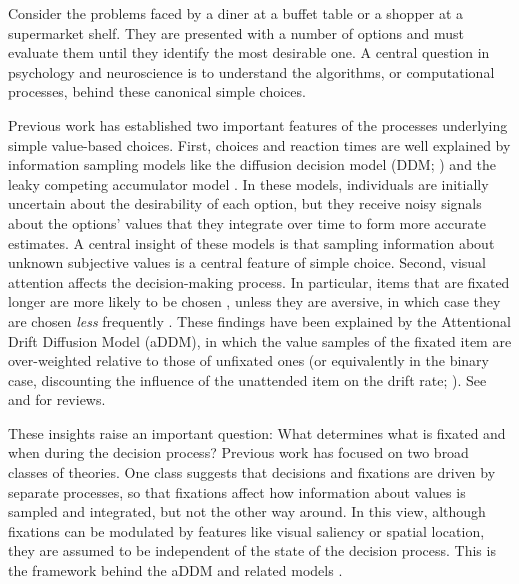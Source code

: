 Consider the problems faced by a diner at a buffet table or a shopper at a supermarket shelf. They are presented with a number of options and must evaluate them until they identify the most desirable one. A central question in psychology and neuroscience is to understand the algorithms, or computational processes, behind these canonical simple choices.

Previous work has established two important features of the processes underlying simple value-based choices. First, choices and reaction times are well explained by information sampling models like the diffusion decision model (DDM; \citealp{ratcliff2008diffusion,ratcliff2016diffusion,milosavljevic2010drift}) and the leaky competing accumulator model \citep{usher2001time,usher2004loss}. In these models, individuals are initially uncertain about the desirability of each option, but they receive noisy signals about the options' values that they integrate over time to form more accurate estimates. A central insight of these models is that sampling information about unknown subjective values is a central feature of simple choice. Second, visual attention affects the decision-making process. In particular, items that are fixated longer are more likely to be chosen \citep{shimojo2003gaze,armel2008biasing,glaholt2009stimulus,krajbich2010visual,krajbich2011multialternative,cavanagh2014eye,tavares2017attentional,smith2019gaze}, unless they are aversive, in which case they are chosen \emph{less} frequently \citep{armel2008neuroeconomic,armel2008biasing}. These findings have been explained by the Attentional Drift Diffusion Model (aDDM), in which the value samples of the fixated item are over-weighted relative to those of unfixated ones (or equivalently in the binary case, discounting the influence of the unattended item on the drift rate; \citealp{krajbich2010visual,krajbich2011multialternative,smith2019gaze,tavares2017attentional}). See \citet{orquin2013attention} and \citet{krajbich2018accounting} for reviews.

These insights raise an important question: What determines what is fixated and when during the decision process? Previous work has focused on two broad classes of theories. One class suggests that decisions and fixations are driven by separate processes, so that fixations affect how information about values is sampled and integrated, but not the other way around. In this view, although fixations can be modulated by features like visual saliency or spatial location, they are assumed to be independent of the state of the decision process. This is the framework behind the aDDM \citep{krajbich2010visual,krajbich2011multialternative,tavares2017attentional} and related models \citep{gluth2018valuebaseda,towal2013simultaneous,thomas2019gaze}.

